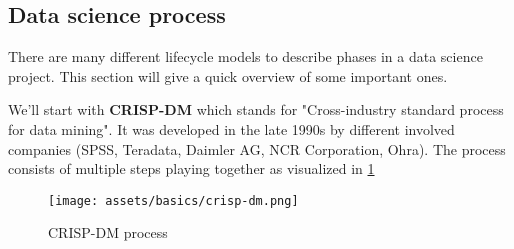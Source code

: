 
\subsection{Data science process}
There are many different lifecycle models to describe phases in a data science project. This section will give a quick overview of some important ones.

We'll start with \textbf{CRISP-DM} which stands for "Cross-industry standard process for data mining". It was developed in the late 1990s by different involved companies (SPSS, Teradata, Daimler AG, NCR Corporation, Ohra). The process consists of multiple steps playing together as visualized in \ref{fig:1_crisp_dm}

\begin{figure}[H]
  \centering
  \texttt{[image: assets/basics/crisp-dm.png]}
  \caption{CRISP-DM process}
  \label{fig:1_crisp_dm}
\end{figure}

